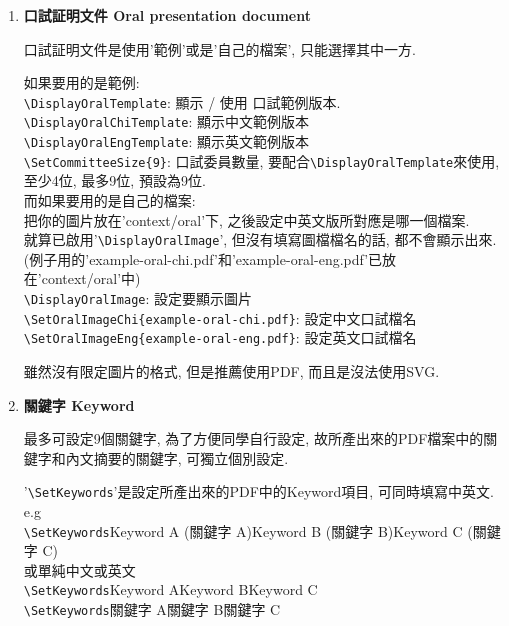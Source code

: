 \begin{enumerate}
{    使用\verb|\SetAdvisorNameA|是必須的, 而如果你的指導教授有2或3位, 那只要增加\verb|\SetAdvisorNameB|和\verb|\SetAdvisorNameC|則可.

    如: \verb|\SetAdvisorNameA{老師的中文名字}{老師的英文名字}|
  } %

  \item
  {
    \textbf{口試証明文件 Oral presentation document}

    口試証明文件是使用'範例'或是'自己的檔案', 只能選擇其中一方.

    如果要用的是範例:\\
    \verb|\DisplayOralTemplate|: 顯示 / 使用 口試範例版本.\\
    \verb|\DisplayOralChiTemplate|: 顯示中文範例版本\\
    \verb|\DisplayOralEngTemplate|: 顯示英文範例版本\\
    \verb|\SetCommitteeSize{9}|: 口試委員數量, 要配合\verb|\DisplayOralTemplate|來使用, 至少4位, 最多9位, 預設為9位.\\

    而如果要用的是自己的檔案:\\
    把你的圖片放在'context/oral'下, 之後設定中英文版所對應是哪一個檔案.\\
    就算已啟用'\verb|\DisplayOralImage|', 但沒有填寫圖檔檔名的話, 都不會顯示出來.\\
    (例子用的'example-oral-chi.pdf'和'example-oral-eng.pdf'已放在'context/oral'中)\\
    \verb|\DisplayOralImage|: 設定要顯示圖片\\
    \verb|\SetOralImageChi{example-oral-chi.pdf}|: 設定中文口試檔名\\
    \verb|\SetOralImageEng{example-oral-eng.pdf}|: 設定英文口試檔名

    雖然沒有限定圖片的格式, 但是推薦使用PDF, 而且是沒法使用SVG.
  } %

  \item
  {
    \textbf{關鍵字 Keyword}

    最多可設定9個關鍵字, 為了方便同學自行設定, 故所產出來的PDF檔案中的關鍵字和內文摘要的關鍵字, 可獨立個別設定.

    '\verb|\SetKeywords|'是設定所產出來的PDF中的Keyword項目, 可同時填寫中英文.
    e.g\\
    \verb|\SetKeywords|{Keyword A (關鍵字 A)}{Keyword B (關鍵字 B)}{Keyword C (關鍵字 C)}\\
    或單純中文或英文\\
    \verb|\SetKeywords|{Keyword A}{Keyword B}{Keyword C}\\
    \verb|\SetKeywords|{關鍵字 A}{關鍵字 B}{關鍵字 C}

}
\end{enumerate}
